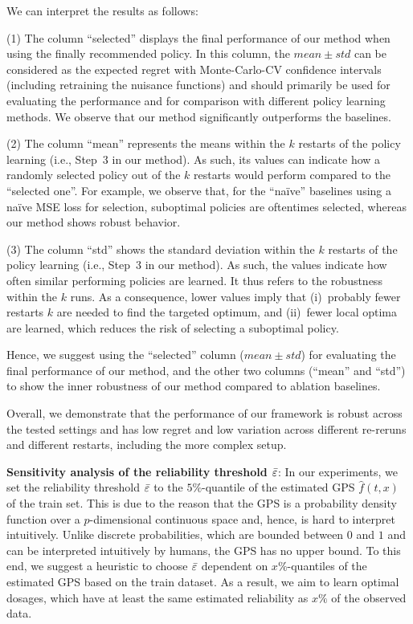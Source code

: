 We can interpret the results as follows:

(1) The column ``selected'' displays the final performance of our method when using the finally recommended policy. In this column, the $ mean \pm std $ can be considered as the expected regret with Monte-Carlo-CV confidence intervals (including retraining the nuisance functions) and should primarily be used for evaluating the performance and for comparison with different policy learning methods. We observe that our method significantly outperforms the baselines. 
 
(2) The column ``mean'' represents the means within the $k$ restarts of the policy learning (i.e., Step~3 in our method). As such, its values can indicate how a randomly selected policy out of the $k$ restarts would perform compared to the ``selected one''. For example, we observe that, for the ``na{\"i}ve'' baselines using a na{\"i}ve MSE loss for selection, suboptimal policies are oftentimes selected, whereas our method shows robust behavior. 
 
(3) The column ``std'' shows the standard deviation within the $k$ restarts of the policy learning (i.e., Step~3 in our method). As such, the values indicate how often similar performing policies are learned. It thus refers to the robustness within the $k$ runs. As a consequence, lower values imply that (i)~probably fewer restarts $k$ are needed to find the targeted optimum, and (ii)~fewer local optima are learned, which reduces the risk of selecting a suboptimal policy.
 
Hence, we suggest using the ``selected'' column ($ mean \pm std $) for evaluating the final performance of our method, and the other two columns (``mean'' and ``std'') to show the inner robustness of our method compared to ablation baselines. 

Overall, we demonstrate that the performance of our framework is robust across the tested settings and has low regret and low variation across different re-reruns and different restarts, including the more complex setup.

\textbf{Sensitivity analysis of the reliability threshold $\Bar{\varepsilon}$}: In our experiments, we set the reliability threshold $\Bar{\varepsilon}$ to the $5\%$-quantile of the estimated GPS $\hat{f}(t, x)$ of the train set. This is due to the reason that the GPS is a probability density function over a $p$-dimensional continuous space and, hence, is hard to interpret intuitively. Unlike discrete probabilities, which are bounded between $0$ and $1$ and can be interpreted intuitively by humans, the GPS has no upper bound. To this end, we suggest a heuristic to choose $\Bar{\varepsilon}$ dependent on $x\%$-quantiles of the estimated GPS based on the train dataset. As a result, we aim to learn optimal dosages, which have at least the same estimated reliability as $x\%$ of the observed data.


